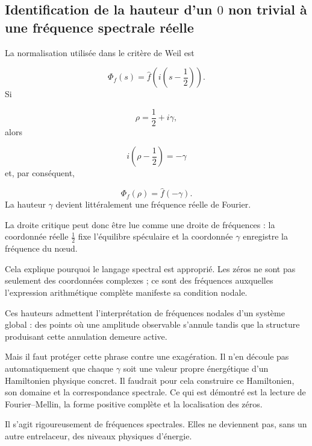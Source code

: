 \subsection{Identification de la hauteur d’un \(0\) non trivial à une fréquence spectrale réelle}
La normalisation utilisée dans le critère de Weil est\par
\[
\Phi_f(s)
=
\widehat f\!\left(
i\left(s-\frac12\right)
\right).
\]
Si\par
\[
\rho=\frac12+i\gamma,
\]
alors\par
\[
i\left(\rho-\frac12\right)
=
-\gamma
\]
et, par conséquent,\par
\[
\Phi_f(\rho)
=
\widehat f(-\gamma).
\]
La hauteur \(\gamma\) devient littéralement une fréquence réelle de Fourier.\par
La droite critique peut donc être lue comme une droite de fréquences : la coordonnée réelle \(\tfrac12\) fixe l’équilibre spéculaire et la coordonnée \(\gamma\) enregistre la fréquence du nœud.\par
Cela explique pourquoi le langage spectral est approprié. Les zéros ne sont pas seulement des coordonnées complexes ; ce sont des fréquences auxquelles l’expression arithmétique complète manifeste sa condition nodale.\par
Ces hauteurs admettent l’interprétation de fréquences nodales d’un système global : des points où une amplitude observable s’annule tandis que la structure produisant cette annulation demeure active.\par
Mais il faut protéger cette phrase contre une exagération. Il n’en découle pas automatiquement que chaque \(\gamma\) soit une valeur propre énergétique d’un Hamiltonien physique concret. Il faudrait pour cela construire ce Hamiltonien, son domaine et la correspondance spectrale. Ce qui est démontré est la lecture de Fourier–Mellin, la forme positive complète et la localisation des zéros.\par
Il s’agit rigoureusement de fréquences spectrales. Elles ne deviennent pas, sans un autre entrelaceur, des niveaux physiques d’énergie.\par
{}
